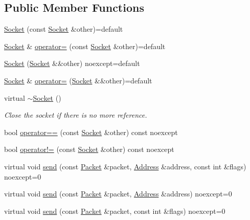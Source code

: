 \subsection*{Public Member Functions}
\begin{DoxyCompactItemize}
\item 
\hyperlink{classtnnf_1_1_socket_ae49afc59cbcde140bad978c18948700c}{Socket} (const \hyperlink{classtnnf_1_1_socket}{Socket} \&other)=default
\item 
\hyperlink{classtnnf_1_1_socket}{Socket} \& \hyperlink{classtnnf_1_1_socket_a6445928435628b3f2f947d83f58dd8b1}{operator=} (const \hyperlink{classtnnf_1_1_socket}{Socket} \&other)=default
\item 
\hyperlink{classtnnf_1_1_socket_a60ee6dacd09d3c4f7076bf5545c0bb9e}{Socket} (\hyperlink{classtnnf_1_1_socket}{Socket} \&\&other) noexcept=default
\item 
\hyperlink{classtnnf_1_1_socket}{Socket} \& \hyperlink{classtnnf_1_1_socket_a54619342cef2087bfe5e5a90b973a903}{operator=} (\hyperlink{classtnnf_1_1_socket}{Socket} \&\&other)=default
\item 
virtual \hyperlink{classtnnf_1_1_socket_ad09e3e0e947e7820f6ed3bb88bdd7c37}{$\sim$\+Socket} ()
\begin{DoxyCompactList}\small\item\em Close the socket if there is no more reference. \end{DoxyCompactList}\item 
bool \hyperlink{classtnnf_1_1_socket_a55c4d0b4a30f65a1d2fb1bc08508db92}{operator==} (const \hyperlink{classtnnf_1_1_socket}{Socket} \&other) const noexcept
\item 
bool \hyperlink{classtnnf_1_1_socket_aac887f4ad6a69a407080879f015de9f1}{operator!=} (const \hyperlink{classtnnf_1_1_socket}{Socket} \&other) const noexcept
\item 
virtual void \hyperlink{classtnnf_1_1_socket_a26c6806603bc33f27f01ba55ce3630a1}{send} (const \hyperlink{classtnnf_1_1_packet}{Packet} \&packet, \hyperlink{classtnnf_1_1_address}{Address} \&address, const int \&flags) noexcept=0
\item 
virtual void \hyperlink{classtnnf_1_1_socket_a9863eeceaff1b078558b1b8c3d541e40}{send} (const \hyperlink{classtnnf_1_1_packet}{Packet} \&packet, \hyperlink{classtnnf_1_1_address}{Address} \&address) noexcept=0
\item 
virtual void \hyperlink{classtnnf_1_1_socket_ac8d4131ac7854d01133b62db70316d0d}{send} (const \hyperlink{classtnnf_1_1_packet}{Packet} \&packet, const int \&flags) noexcept=0

\end{DoxyCompactItemize}
